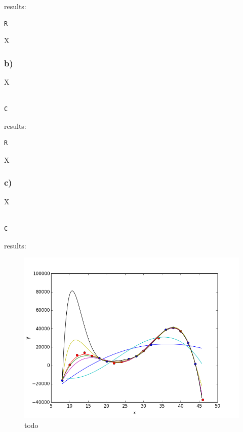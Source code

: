 results:

\begin{lstlisting}[caption=Result of 1.1 a), keywordstyle=\color{black}]
R
\end{lstlisting}

X



\subsubsection{b)}

X

\begin{lstlisting}[caption=todo]

C

\end{lstlisting}


results:

\begin{lstlisting}[caption=Result of 1.1 a), keywordstyle=\color{black}]
R
\end{lstlisting}

X





\subsubsection{c)}

X

\begin{lstlisting}[caption=todo]

C

\end{lstlisting}


results:


\begin{figure}[!ht]
\includegraphics[width=1\textwidth]{chapters/images/figure-5-11-c}
\caption{todo}
\end{figure}

